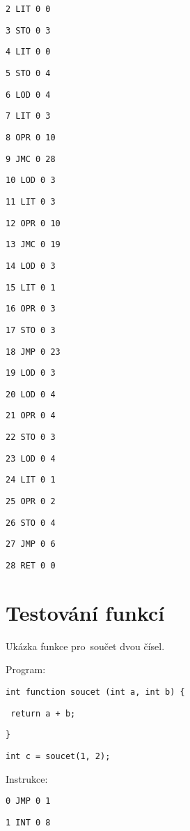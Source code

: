 \documentclass[czech]{thesiskiv}
\begin{document}
\texttt{2	LIT	0	0 }

\texttt{3	STO	0	3  }

\texttt{4	LIT	0	0   }

\texttt{5	STO	0	4    }

\texttt{6	LOD	0	4     }

\texttt{7	LIT	0	3      }

\texttt{8	OPR	0	10      }

\texttt{9	JMC	0	28       }

\texttt{10	LOD	0	3       }

\texttt{11	LIT	0	3        }

\texttt{12	OPR	0	10        }

\texttt{13	JMC	0	19         }

\texttt{14	LOD	0	3           }

\texttt{15	LIT	0	1 }

\texttt{16	OPR	0	3  }

\texttt{17	STO	0	3   }

\texttt{18	JMP	0	23   }

\texttt{19	LOD	0	3     }

\texttt{20	LOD	0	4      }

\texttt{21	OPR	0	4       }

\texttt{22	STO	0	3        }

\texttt{23	LOD	0	4         }

\texttt{24	LIT	0	1          }

\texttt{25	OPR	0	2           }

\texttt{26	STO	0	4            }

\texttt{27	JMP	0	6             }

\texttt{28	RET	0	0              }


\section{Testování funkcí}
Ukázka funkce pro~součet dvou čísel.

\noindent Program:

\texttt{int function soucet (int a, int b) \{}
 
\texttt{    return a + b;}

\texttt{\} }

\texttt{int c = soucet(1, 2); }

\noindent Instrukce: 

\texttt{0	JMP	0	1              }

\texttt{1	INT	0	8              }
\end{document}
